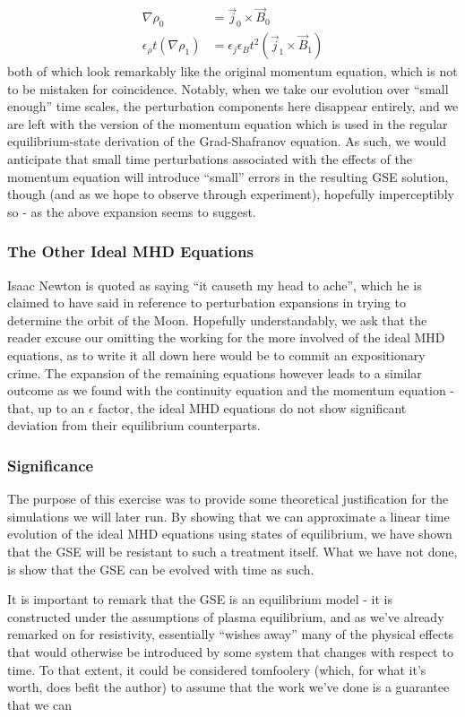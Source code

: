 \begin{align*}
    \nabla \rho_0 &= \vec{j}_0 \times \vec{B}_0 \\
    \epsilon_\rho t (\nabla \rho_1) &= \epsilon_j \epsilon_B t^2 (\vec{j}_1 \times \vec{B}_1) 
\end{align*}
both of which look remarkably like the original momentum equation, which is not to be mistaken for coincidence. Notably, when we take our 
evolution over ``small enough'' time scales, the perturbation components here disappear entirely, and we are left with the version of the 
momentum equation which is used in the regular equilibrium-state derivation of the Grad-Shafranov equation. As such, we would anticipate that 
small time perturbations associated with the effects of the momentum equation will introduce ``small'' errors in the resulting GSE solution, though 
(and as we hope to observe through experiment), hopefully imperceptibly so - as the above expansion seems to suggest.  

\subsubsection{The Other Ideal MHD Equations}
Isaac Newton is quoted as saying ``it causeth my head to ache'', which he is claimed to have said in reference to perturbation expansions 
in trying to determine the orbit of the Moon. Hopefully understandably, we ask that the reader excuse our omitting the working for the more involved of the ideal MHD equations, 
as to write it all down here would be to commit an expositionary crime. The expansion of the remaining equations however leads to a similar outcome 
as we found with the continuity equation and the momentum equation - that, up to an $\epsilon$ factor, the ideal MHD equations do not show significant deviation 
from their equilibrium counterparts. 

\subsubsection{Significance}
The purpose of this exercise was to provide some theoretical justification for the simulations we will later run. By showing that we can 
approximate a linear time evolution of the ideal MHD equations using states of equilibrium, we have shown that the GSE will be resistant 
to such a treatment itself. What we have not done, is show that the GSE can be evolved with time as such. \todo {}

It is important to remark that the GSE is an equilibrium model - it is constructed under the assumptions of plasma equilibrium, and as we've 
already remarked on for resistivity, essentially ``wishes away'' many of the physical effects that would otherwise be introduced by some system that 
changes with respect to time. To that extent, 
it could be considered tomfoolery (which, for what it's worth, does befit the author) to assume that the work we've done is a guarantee that 
we can \todo

